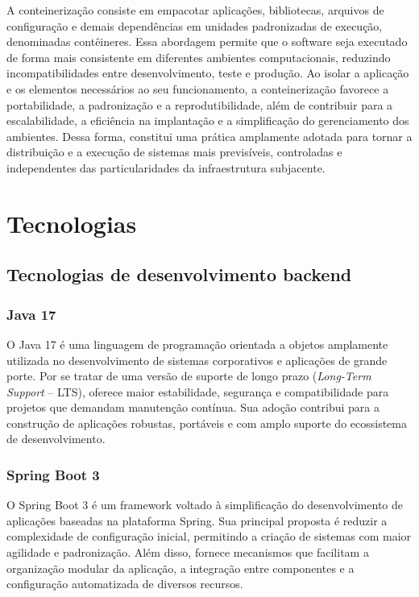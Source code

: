 \documentclass[grad,pdftex]{poli}
\begin{document}
A conteinerização consiste em empacotar aplicações, bibliotecas, arquivos de configuração e demais dependências em unidades padronizadas de execução, denominadas contêineres. Essa abordagem permite que o software seja executado de forma mais consistente em diferentes ambientes computacionais, reduzindo incompatibilidades entre desenvolvimento, teste e produção. Ao isolar a aplicação e os elementos necessários ao seu funcionamento, a conteinerização favorece a portabilidade, a padronização e a reprodutibilidade, além de contribuir para a escalabilidade, a eficiência na implantação e a simplificação do gerenciamento dos ambientes. Dessa forma, constitui uma prática amplamente adotada para tornar a distribuição e a execução de sistemas mais previsíveis, controladas e independentes das particularidades da infraestrutura subjacente.\clearpage{}
    \clearpage{}\chapter{Tecnologias}
\label{chap2}

\section{Tecnologias de desenvolvimento backend}

\subsection{Java 17}

O Java 17 é uma linguagem de programação orientada a objetos amplamente utilizada no desenvolvimento de sistemas corporativos e aplicações de grande porte. Por se tratar de uma versão de suporte de longo prazo (\textit{Long-Term Support} -- LTS), oferece maior estabilidade, segurança e compatibilidade para projetos que demandam manutenção contínua. Sua adoção contribui para a construção de aplicações robustas, portáveis e com amplo suporte do ecossistema de desenvolvimento.

\subsection{Spring Boot 3}

O Spring Boot 3 é um framework voltado à simplificação do desenvolvimento de aplicações baseadas na plataforma Spring. Sua principal proposta é reduzir a complexidade de configuração inicial, permitindo a criação de sistemas com maior agilidade e padronização. Além disso, fornece mecanismos que facilitam a organização modular da aplicação, a integração entre componentes e a configuração automatizada de diversos recursos.
\end{document}
